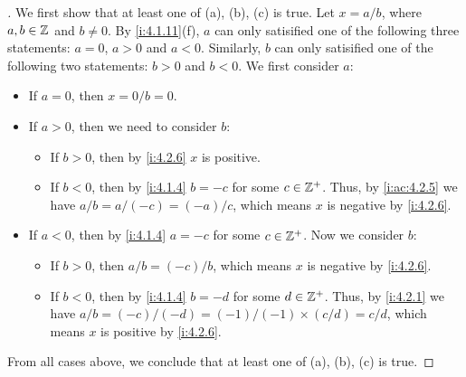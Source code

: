 \begin{proof}[]
  We first show that at least one of (a), (b), (c) is true.
  Let \(x = a / b\), where \(a, b \in \mathbb{Z}\) and \(b \neq 0\).
  By \cref{i:4.1.11}(f), \(a\) can only satisified one of the following three statements:
  \(a = 0\), \(a > 0\) and \(a < 0\).
  Similarly, \(b\) can only satisified one of the following two statements:
  \(b > 0\) and \(b < 0\).
  We first consider \(a\):
  \begin{itemize}
    \item If \(a = 0\), then \(x = 0 / b = 0\).
    \item If \(a > 0\), then we need to consider \(b\):
          \begin{itemize}
            \item If \(b > 0\), then by \cref{i:4.2.6} \(x\) is positive.
            \item If \(b < 0\), then by \cref{i:4.1.4} \(b = -c\) for some \(c \in \mathbb{Z}^+\).
                  Thus, by \cref{i:ac:4.2.5} we have \(a / b = a / (-c) = (-a) / c\), which means \(x\) is negative by \cref{i:4.2.6}.
          \end{itemize}
    \item If \(a < 0\), then by \cref{i:4.1.4} \(a = -c\) for some \(c \in \mathbb{Z}^+\).
          Now we consider \(b\):
          \begin{itemize}
            \item If \(b > 0\), then \(a / b = (-c) / b\), which means \(x\) is negative by \cref{i:4.2.6}.
            \item If \(b < 0\), then by \cref{i:4.1.4} \(b = -d\) for some \(d \in \mathbb{Z}^+\).
                  Thus, by \cref{i:4.2.1} we have \(a / b = (-c) / (-d) = (-1) / (-1) \times (c / d) = c / d\), which means \(x\) is positive by \cref{i:4.2.6}.
          \end{itemize}
  \end{itemize}
  From all cases above, we conclude that at least one of (a), (b), (c) is true.


\end{proof}
